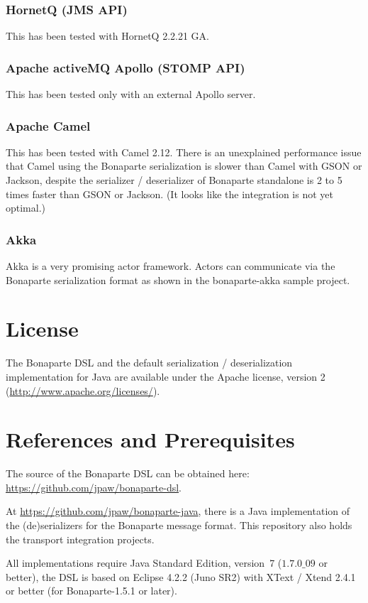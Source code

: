 \documentclass[11pt,a4paper,oneside]{article}
\begin{document}
\subsubsection{HornetQ (JMS API)}
This has been tested with HornetQ 2.2.21 GA.

\subsubsection{Apache activeMQ Apollo (STOMP API)}
This has been tested only with an external Apollo server.

\subsubsection{Apache Camel}
This has been tested with Camel 2.12. There is an unexplained performance issue that Camel using the Bonaparte serialization is slower than Camel with GSON or Jackson,
 despite the serializer / deserializer of Bonaparte standalone is 2 to 5 times faster than GSON or Jackson. (It looks like the integration is not yet optimal.)

\subsubsection{Akka}
Akka is a very promising actor framework. Actors can communicate via the Bonaparte serialization format as shown in the bonaparte-akka sample project.

\section{License}
The Bonaparte DSL and the default serialization / deserialization implementation for Java
are available under the Apache license, version 2 (\url{http://www.apache.org/licenses/}). 

\section{References and Prerequisites}
The source of the Bonaparte DSL can be obtained here: \url{https://github.com/jpaw/bonaparte-dsl}.

At \url{https://github.com/jpaw/bonaparte-java}, there is a Java implementation of the (de)serializers for the Bonaparte message format. This repository also holds the transport integration projects.

All implementations require Java Standard Edition, version~7 ($1.7.0\_09$ or better), the DSL is based on Eclipse 4.2.2 (Juno
SR2) with XText / Xtend 2.4.1 or better (for Bonaparte-1.5.1 or later).
\end{document}
